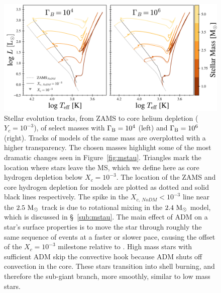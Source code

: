 \documentclass[useAMS,usenatbib]{mnras}
\begin{document}
\begin{figure}
  \centering
  \includegraphics[width=\textwidth]{plots/tracks.png}
  \caption{
  Stellar evolution tracks, from ZAMS to core helium depletion ($Y_c=10^{-3}$), of select masses with $\Gamma_\mathrm{B} = 10^{4}$ (left) and $\Gamma_\mathrm{B} = 10^{6}$ (right). Tracks of \nodm models of the same mass are overplotted with a higher transparency. The chosen masses highlight some of the most dramatic changes seen in Figure~\ref{fig:mstau}. Triangles mark the location where stars leave the MS, which we define here as core hydrogen depletion below $X_c=10^{-3}$. The location of the ZAMS and core hydrogen depletion for \nodm models are plotted as dotted and solid black lines respectively. The spike in the $X_{c,\ NoDM} < 10^{-3}$ line near the $2.5 \ \mathrm{M}_{\odot}$ track is due to rotational mixing in the $2.4 \ \mathrm{M}_{\odot}$ model, which is discussed in \S~\ref{sub:mstau}. The main effect of ADM on a star's surface properties is to move the star through roughly the same sequence of events at a faster or slower pace, causing the offset of the $X_c=10^{-3}$ milestone relative to \nodm. High mass stars with sufficient ADM skip the convective hook because ADM shuts off convection in the core. These stars transition into shell burning, and therefore the sub-giant branch, more smoothly, similar to low mass stars.
  }
  \label{fig:tracks}
\end{figure}
\end{document}
